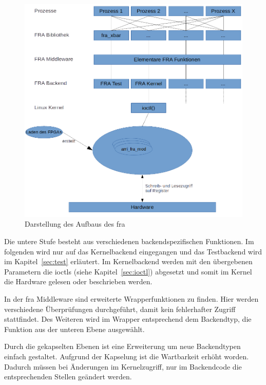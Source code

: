 \begin{figure}[!hbtp]
	\centering
	\includegraphics[width = \linewidth]{pictures/2019-11-17_FRA_Overview.png}
	\smallskip
	\caption{Darstellung des Aufbaus des \ac{fra}}
	\label{fig:overview}
\end{figure} 

Die untere Stufe besteht aus verschiedenen backendspezifischen Funktionen. Im folgenden wird nur auf das Kernelbackend eingegangen und das Testbackend wird im Kapitel~\ref{sec:test} erläutert. Im Kernelbackend werden mit den übergebenen Parametern die \ac{ioctl}s (siehe Kapitel~\ref{sec:ioctl}) abgesetzt und somit im Kernel die Hardware gelesen oder beschrieben werden.

In der \ac{fra} Middleware sind erweiterte Wrapperfunktionen zu finden. Hier werden verschiedene Überprüfungen durchgeführt, damit kein fehlerhafter Zugriff stattfindet. Des Weiteren wird im Wrapper entsprechend dem Backendtyp, die Funktion aus der unteren Ebene ausgewählt. 

Durch die gekapselten Ebenen ist eine Erweiterung um neue Backendtypen einfach gestaltet. 
Aufgrund der Kapselung ist die Wartbarkeit erhöht worden. Dadurch müssen bei Änderungen im Kernelzugriff, nur im Backendcode die entsprechenden Stellen geändert werden.\\

